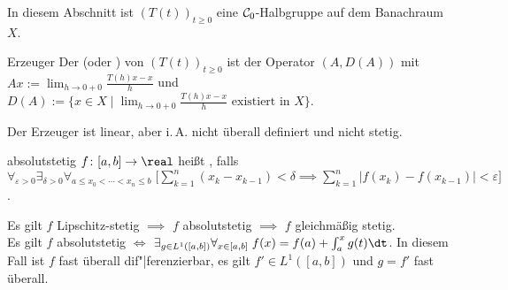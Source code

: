 \begin{Bem}
    In diesem Abschnitt ist $(T(t))_{t \ge 0}$ eine $\mathcal{C}_0$-Halbgruppe auf dem Banachraum $X$.
\end{Bem}

\begin{Def}{Erzeuger}
    Der  (oder ) von $(T(t))_{t \ge 0}$ ist
    der Operator $(A, D(A))$ mit $Ax := \lim_{h \to 0+0} \frac{T(h) x - x}{h}$ und
    $D(A) := \{x \in X \;|\;
    \text{$\lim_{h \to 0+0} \frac{T(h) x - x}{h}$ existiert in $X$}\}$.
\end{Def}

\begin{Bem}
    Der Erzeuger ist linear, aber i.\,A. nicht überall definiert und nicht stetig.
\end{Bem}

\linie

\begin{Def}{absolutstetig}
    $f\colon [a, b] \to \real$ heißt , falls\\
    $\forall_{\varepsilon > 0} \exists_{\delta > 0}
    \forall_{a \le x_0 < \dotsb < x_n \le b}\;
    \big[\sum_{k=1}^n (x_k - x_{k-1}) < \delta \implies
    \sum_{k=1}^n |f(x_k) - f(x_{k-1})| < \varepsilon\big]$.
\end{Def}

\begin{Bem}
    Es gilt $f$ Lipschitz-stetig $\implies$ $f$ absolutstetig $\implies$ $f$ gleichmäßig stetig.\\
    Es gilt $f$ absolutstetig $\iff$
    $\exists_{g \in L^1([a, b])} \forall_{x \in [a, b]}\; f(x) = f(a) + \int_a^x g(t)\dt$.
    In diesem Fall ist $f$ fast überall dif"|ferenzierbar, es gilt $f' \in L^1([a, b])$
    und $g = f'$ fast überall.
\end{Bem}

